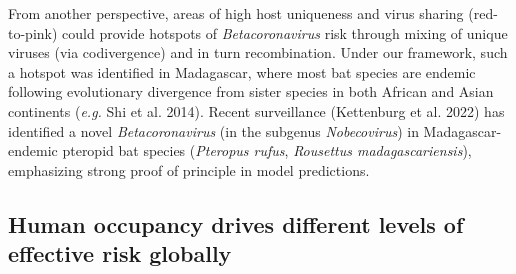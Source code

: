 \documentclass[11pt]{article}
\begin{document}
From another perspective, areas of high host uniqueness and virus
sharing (red-to-pink) could provide hotspots of \emph{Betacoronavirus}
risk through mixing of unique viruses (via codivergence) and in turn
recombination. Under our framework, such a hotspot was identified in
Madagascar, where most bat species are endemic following evolutionary
divergence from sister species in both African and Asian continents
(\emph{e.g.} Shi et al. 2014). Recent surveillance (Kettenburg et al.
2022) has identified a novel \emph{Betacoronavirus} (in the subgenus
\emph{Nobecovirus}) in Madagascar-endemic pteropid bat species
(\emph{Pteropus rufus}, \emph{Rousettus madagascariensis}), emphasizing
strong proof of principle in model predictions.

\hypertarget{human-occupancy-drives-different-levels-of-effective-risk-globally}{%
\subsection{Human occupancy drives different levels of effective risk
globally}\label{human-occupancy-drives-different-levels-of-effective-risk-globally}}
\end{document}
